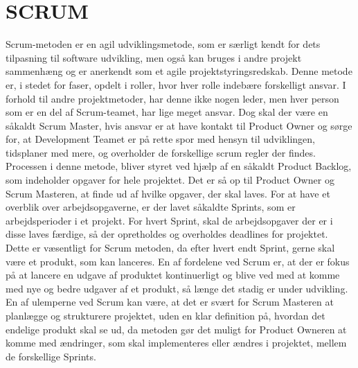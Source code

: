 \section{SCRUM}
Scrum-metoden er en agil udviklingsmetode, som er særligt kendt for dets tilpasning til software udvikling, men også kan bruges i andre projekt sammenhæng og er anerkendt som et agile projektstyringsredskab. Denne metode er, i stedet for faser, opdelt i roller, hvor hver rolle indebære forskelligt ansvar.\cite{ScrumRoles} 
I forhold til andre projektmetoder, har denne ikke nogen leder, men hver person som er en del af Scrum-teamet, har lige meget ansvar. Dog skal der være en såkaldt Scrum Master, hvis ansvar er at have kontakt til Product Owner og sørge for, at Development Teamet er på rette spor med hensyn til udviklingen, tidsplaner med mere, og overholder de forskellige scrum regler der findes. Processen i denne metode, bliver styret ved hjælp af en såkaldt Product Backlog, som indeholder opgaver for hele projektet. Det er så op til Product Owner og Scrum Masteren, at finde ud af hvilke opgaver, der skal laves. For at have et overblik over arbejdsopgaverne, er der lavet såkaldte Sprints, som er arbejdsperioder i et projekt. For hvert Sprint, skal de arbejdsopgaver der er i disse laves færdige, så der opretholdes og overholdes deadlines for projektet. Dette er væsentligt for Scrum metoden, da efter hvert endt Sprint, gerne skal være et produkt, som kan lanceres. En af fordelene ved Scrum er, at der er fokus på at lancere en udgave af produktet kontinuerligt og blive ved med at komme med nye og bedre udgaver af et produkt, så længe det stadig er under udvikling. En af ulemperne ved Scrum kan være, at det er svært for Scrum Masteren at planlægge og strukturere projektet, uden en klar definition på, hvordan det endelige produkt skal se ud, da metoden gør det muligt for Product Owneren at komme med ændringer, som skal implementeres eller ændres i projektet, mellem de forskellige Sprints.\cite{SCRUM}

